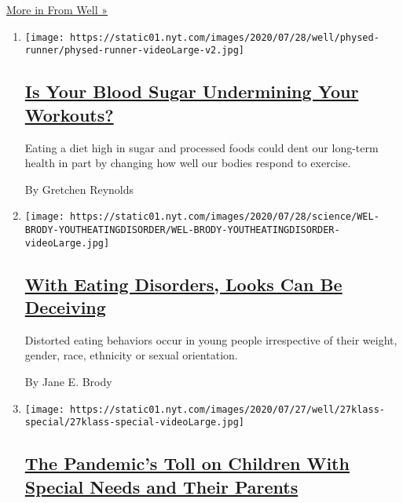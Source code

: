 \href{/section/well}{More in From Well »}

\begin{enumerate}
\def\labelenumi{\arabic{enumi}.}
\item
  \texttt{[image: https://static01.nyt.com/images/2020/07/28/well/physed-runner/physed-runner-videoLarge-v2.jpg]}

  \hypertarget{is-your-blood-sugar-undermining-your-workouts}{%
  \subsection{\texorpdfstring{\href{/2020/07/29/well/move/blood-sugar-diet-foods-workouts-exercise-muscles.html}{Is
  Your Blood Sugar Undermining Your
  Workouts?}}{Is Your Blood Sugar Undermining Your Workouts?}}\label{is-your-blood-sugar-undermining-your-workouts}}

  Eating a diet high in sugar and processed foods could dent our
  long-term health in part by changing how well our bodies respond to
  exercise.

  By Gretchen Reynolds
\item
  \texttt{[image: https://static01.nyt.com/images/2020/07/28/science/WEL-BRODY-YOUTHEATINGDISORDER/WEL-BRODY-YOUTHEATINGDISORDER-videoLarge.jpg]}

  \hypertarget{with-eating-disorders-looks-can-be-deceiving}{%
  \subsection{\texorpdfstring{\href{/2020/07/27/well/eat/eating-disorders.html}{With
  Eating Disorders, Looks Can Be
  Deceiving}}{With Eating Disorders, Looks Can Be Deceiving}}\label{with-eating-disorders-looks-can-be-deceiving}}

  Distorted eating behaviors occur in young people irrespective of their
  weight, gender, race, ethnicity or sexual orientation.

  By Jane E. Brody
\item
  \texttt{[image: https://static01.nyt.com/images/2020/07/27/well/27klass-special/27klass-special-videoLarge.jpg]}

  \hypertarget{the-pandemics-toll-on-children-with-special-needs-and-their-parents}{%
  \subsection{\texorpdfstring{\href{/2020/07/27/well/family/children-special-needs-pandemic.html}{The
  Pandemic's Toll on Children With Special Needs and Their
  Parents}}{The Pandemic's Toll on Children With Special Needs and Their Parents}}\label{the-pandemics-toll-on-children-with-special-needs-and-their-parents}}


\end{enumerate}
